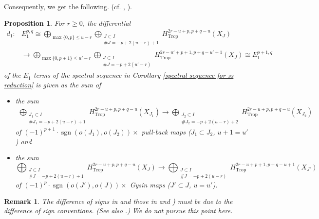 \documentclass[12pt,a4]{amsart}
\newtheorem{prp}[thm]{Proposition}
\newtheorem{rem}[thm]{Remark}
\def\sgn{\mathop{\mathrm{sgn}}\nolimits}
\def\Trop{\mathop{\mathrm{trop}}\nolimits}
\def\Trop{\mathop{\mathrm{Trop}}\nolimits}
\numberwithin{equation}{section}
\numberwithin{figure}{section}
\begin{document}
  Consequently, we get the following.
   (cf. \cite[Lemme 2.7]{GuillenNavarroSurlethormelocaldescyclesinvariantsAznar1990}, 
     \cite[Subsection 11.3.2]{PetersSteenbrinkMixedHodgestructures2008}).
  \begin{prp}\label{differential of monodromy-weight spectral sequence:label}
    For $r \geq 0$, the differential 
    \begin{align*}
    d_1 \colon 
    &
    E_1^{p,q} \cong 
    \bigoplus_{ \max \{0,p\} \leq u -r }
    \bigoplus_{\substack{ J \subset I \\ \# J = -p + 2(u-r)+1 } }
    H^{2r-u+p, p+q -u}_{\Trop} (X_{J})  
    \\
     & \to 
    \bigoplus_{ \max \{0,p+1\} \leq u'-r  }
    \bigoplus_{\substack{ J \subset I \\ \# J = -p + 2(u'-r) } }
    H^{2r-u'+p+1, p +q -u'+1}_{\Trop} (X_{J}) 
     \cong E_1^{p+1,q}
    \end{align*}
    of 
    the $E_1$-terms of the spectral sequence 
    in 
    Corollary \ref{spectral sequence for ss reduction} 
    is given as the sum of 
    \begin{itemize}
      \item the sum  
    \begin{align*}
      \bigoplus_{\substack{ J_1 \subset I 
                      \\ \# J_1 = -p + 2(u-r)+1 } }
     H^{2r-u+p, p+q -u}_{\Trop} (X_{J_1})  
      \to 
      \bigoplus_{\substack{ J_2 \subset I 
                       \\ \# J_2 = -p + 2(u-r) +2 } }
      H^{2r-u+p, p +q -u}_{\Trop} (X_{J_2}) 
    \end{align*}
    of 
    $ (-1)^{p+1} \cdot  \sgn ( o(J_1), o(J_2) ) \times $
    pull-back maps  
     ($J_1 \subset J_2$,  $u+1=u'$)
    and 
    \item the sum  
     $$
    \bigoplus_{\substack{ J \subset I \\ \# J = -p + 2(u-r)+1 } }
    H^{2r-u+p, p+q -u}_{\Trop} (X_{J})  
      \to 
    \bigoplus_{\substack{ J \subset I \\ \# J = -p + 2(u-r) } }
    H^{2r-u+p+1, p +q -u+1}_{\Trop} (X_{J'}) 
    $$
    of 
     $ (-1)^{p} \cdot  \sgn (o(J'), o(J))  \times $
      Gysin maps 
    ($J' \subset J  $, $u=u'$).
    \end{itemize}
  \end{prp}

  \begin{rem}
   The difference of signs in  
   and those in   
    \cite[Lemme 2.7]{GuillenNavarroSurlethormelocaldescyclesinvariantsAznar1990} and  
     \cite[Subsection 11.3.2]{PetersSteenbrinkMixedHodgestructures2008})
     must be due to the difference of sign conventions.
     (See also .)
     We do not pursue this point here.
  \end{rem}
\end{document}
